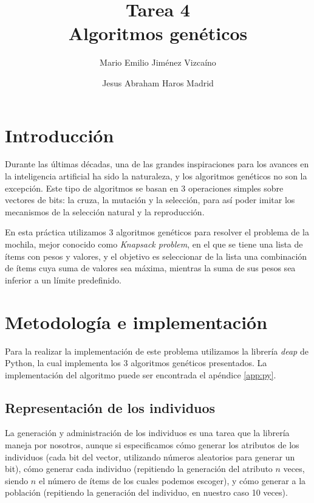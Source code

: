 \documentclass[sigconf,authorversion,nonacm]{acmart}
\begin{document}
\title{Tarea 4 \\ Algoritmos genéticos}

\author{Mario Emilio Jiménez Vizcaíno}
\affiliation{}

\author{Jesus Abraham Haros Madrid}
\affiliation{}


\maketitle

\section{Introducción}
Durante las últimas décadas, una de las grandes inspiraciones para los avances en la inteligencia artificial ha sido la naturaleza, y los algoritmos genéticos no son la excepción. Este tipo de algoritmos se basan en 3 operaciones simples sobre vectores de bits: la cruza, la mutación y la selección, para así poder imitar los mecanismos de la selección natural y la reproducción.\cite{holland1992genetic}

En esta práctica utilizamos 3 algoritmos genéticos para resolver el problema de la mochila, mejor conocido como \textit{Knapsack problem}, en el que se tiene una lista de ítems con pesos y valores, y el objetivo es seleccionar de la lista una combinación de ítems cuya suma de valores sea máxima, mientras la suma de sus pesos sea inferior a un límite predefinido.


\section{Metodología e implementación}
Para la realizar la implementación de este problema utilizamos la librería \textit{deap} de Python, la cual implementa los 3 algoritmos genéticos presentados.\cite{DEAP_JMLR2012} La implementación del algoritmo puede ser encontrada el apéndice \ref{app:py}.

\subsection{Representación de los individuos}
La generación y administración de los individuos es una tarea que la librería maneja por nosotros, aunque si especificamos cómo generar los atributos de los individuos (cada bit del vector, utilizando números aleatorios para generar un bit), cómo generar cada individuo (repitiendo la generación del atributo $n$ veces, siendo $n$ el número de ítems de los cuales podemos escoger), y cómo generar a la población (repitiendo la generación del individuo, en nuestro caso 10 veces).
\end{document}
